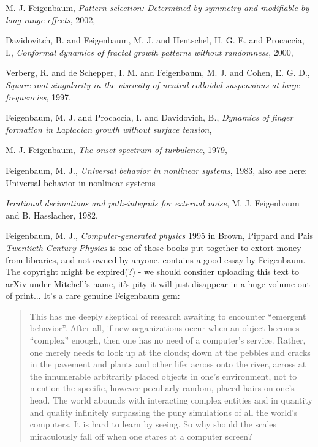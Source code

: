 \begin{description}
{M. J. Feigenbaum},
{\em Pattern selection: {Determined} by symmetry and modifiable by long-range effects},
{2002},

{Davidovitch, B. and Feigenbaum, M. J. and Hentschel, H. G. E. and Procaccia, I.},
  {\em Conformal dynamics of fractal growth patterns without randomness},
{2000},

{Verberg, R. and de Schepper, I. M. and Feigenbaum, M. J. and Cohen, E. G. D.},
  {\em Square root singularity in the viscosity of neutral colloidal suspensions at large frequencies},
{1997},

{Feigenbaum, M. J. and Procaccia, I. and Davidovich, B.},
  {\em Dynamics of finger formation in {Laplacian} growth without surface tension},

{M. J. Feigenbaum},
{\em The onset spectrum of turbulence},
{1979},

{Feigenbaum, M. J.},
{\em Universal behavior in nonlinear systems},
{1983},
also see here:
{Universal behavior in nonlinear systems}

{\em Irrational decimations and path-integrals for external noise},
{M. J. Feigenbaum and B. Hasslacher},
{1982},

{Feigenbaum, M. J.},
{\em Computer-generated physics}
1995 in {Brown, Pippard  and Pais}
{\em {Twentieth Century Physics}}
is one of those books put together to extort money from libraries, and
not owned by anyone, contains a good essay by Feigenbaum. The copyright
might be expired(?) - we should consider uploading this text to arXiv
under Mitchell's name, it's pity it will just disappear in a huge volume
out of print... It's a rare genuine Feigenbaum gem:

\begin{quote}
This has me deeply skeptical of research awaiting to encounter ``emergent
behavior''. After all, if new organizations occur when an object becomes
``complex'' enough, then one has no need of a computer's service. Rather,
one merely needs to look up at the clouds; down at the pebbles and cracks
in the pavement and plants and other life; across onto the river, across
at the innumerable arbitrarily placed objects in one's environment, not
to mention the specific, however peculiarly random, placed hairs on one's
head. The world abounds with interacting complex entities and in quantity
and quality infinitely surpassing the puny simulations of all the world's
computers. It is hard to learn by seeing. So why should the scales
miraculously fall off when one stares at a computer screen?


\end{quote}
\end{description}
